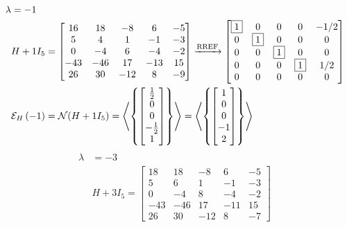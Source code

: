 \documentclass{ximera}
\begin{document}
\begin{example}
\begin{align*}
  \end{align*}
  \begin{align*}
    \lambda&=-1\\&H+1I_5=
                   \begin{bmatrix}
                     16 & 18 & -8 & 6 & -5\\
                     5 & 4 & 1 & -1 & -3\\
                     0 & -4 & 6 & -4 & -2\\
                     -43 & -46 & 17 & -13 & 15\\
                     26 & 30 & -12 & 8 & -9
                   \end{bmatrix}
                                         \xrightarrow{\text{RREF}}
                                         \begin{bmatrix}
                                           \fbox{1} & 0 & 0 & 0 & -1/2\\
                                           0 & \fbox{1} & 0 & 0 & 0\\
                                           0 & 0 & \fbox{1} & 0 & 0\\
                                           0 & 0 & 0 & \fbox{1} & 1/2\\
                                           0 & 0 & 0 & 0 & 0
                                         \end{bmatrix}\\
           &\mathcal{E}_{H}\left(-1\right)=\mathcal{N}\!\left(H+1I_5\right)
             =\left\langle\left\{\begin{bmatrix}\frac{1}{2}\\0\\0\\-\frac{1}{2}\\1\end{bmatrix}\right\}\right\rangle
    =\left\langle\left\{\begin{bmatrix}1\\0\\0\\-1\\2\end{bmatrix}\right\}\right\rangle
  \end{align*}
  \begin{align*}
    \lambda&=-3\\&H+3I_5=
                   \begin{bmatrix}
                     18 & 18 & -8 & 6 & -5\\
                     5 & 6 & 1 & -1 & -3\\
                     0 & -4 & 8 & -4 & -2\\
                     -43 & -46 & 17 & -11 & 15\\
                     26 & 30 & -12 & 8 & -7

\end{bmatrix}
\end{align*}
\end{example}
\end{document}
